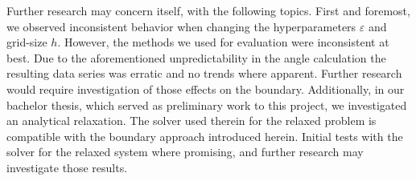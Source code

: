 \documentclass{mimosis}
\begin{document}
Further research may concern itself, with the following topics. First and foremost, we observed inconsistent behavior when changing the hyperparameters \(\varepsilon\) and grid-size \(h\). However, the methods we used for evaluation were inconsistent at best. Due to the aforementioned unpredictability in the angle calculation the resulting data series was erratic and no trends where apparent. Further research would require investigation of those effects on the boundary. Additionally, in our bachelor thesis, which served as preliminary work to this project, we investigated an analytical relaxation. The solver used therein for the relaxed problem is compatible with the boundary approach introduced herein. Initial tests with the solver for the relaxed system where promising, and further research may investigate those results.


\printbibliography
\end{document}

